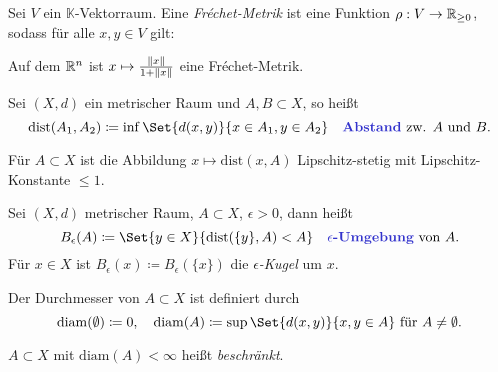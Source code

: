 \documentclass{cheat-sheet}
\newcommand{\K}{\mathbb{K}}
\newcommand{\dist}{\mathrm{dist}} %
\newcommand{\diam}{\mathrm{diam}} %
\begin{document}

\begin{defn}
  Sei $V$ ein $\K$-Vektorraum. Eine \emph{Fréchet-Metrik} ist eine Funktion $\rho : V \to \mathbb{R}_{\geq 0}$, sodass für alle $x, y \in V$ gilt:
  \begin{itemize}
  \end{itemize}
\end{defn}

\begin{bsp}
  Auf dem $\mathbb{R}^n$ ist $x \mapsto \tfrac{\lVert x\rVert}{1 + \lVert x\rVert}$ eine Fréchet-Metrik.
\end{bsp}

\begin{defn}
  Sei $(X, d)$ ein metrischer Raum und $A, B \subset X$, so heißt
  \[ \dist(A_1, A_2) \coloneqq \inf \Set{ d(x,y) }{ x \in A_1, y \in A_2 } \quad \text{\emph{Abstand} zw. $A$ und $B$.} \]
\end{defn}


\begin{bem}
  Für $A \subset X$ ist die Abbildung $x \mapsto \dist(x, A)$ Lipschitz-stetig mit Lipschitz-Konstante $\leq 1$.
\end{bem}

\begin{defn}
  Sei $(X, d)$ metrischer Raum, $A \subset X$, $\epsilon > 0$, dann heißt
  \[ B_\epsilon(A) \coloneqq \Set{ y \in X }{ \dist(\{ y \}, A) < A} \quad \text{\emph{$\epsilon$-Umgebung} von $A$.} \]
  Für $x \in X$ ist $B_\epsilon(x) \coloneqq B_\epsilon(\{ x \})$ die \emph{$\epsilon$-Kugel} um $x$.
\end{defn}

\begin{defn}
  Der Durchmesser von $A \subset X$ ist definiert durch
  \[ \diam(\emptyset) \coloneqq 0, \quad \diam(A) \coloneqq \sup \Set{ d(x, y) }{ x, y \in A } \text{ für } A \not= \emptyset. \]
\end{defn}

\begin{defn}
  $A {\subset} X$ mit $\diam(A) < \infty$ heißt \emph{beschränkt}.
\end{defn}
\end{document}
